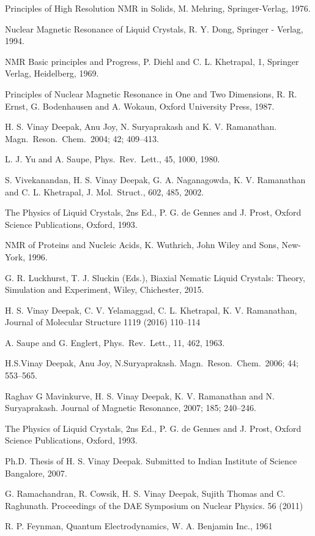\begin{thebibliography}{99}
 Principles of High Resolution NMR in Solids, M. Mehring, Springer-Verlag, 1976.

 Nuclear Magnetic Resonance of Liquid Crystals, R. Y. Dong, Springer - Verlag, 1994.

 NMR Basic principles and Progress, P. Diehl and C. L. Khetrapal, 1, Springer Verlag, Heidelberg, 1969.

 Principles of Nuclear Magnetic Resonance in One and Two Dimensions, R. R. Ernst, G. Bodenhausen and A. Wokaun, Oxford University Press, 1987.

 H. S. Vinay Deepak, Anu Joy, N. Suryaprakash and K. V. Ramanathan. Magn.\ Reson.\ Chem.\ 2004; 42; 409--413.

 L. J. Yu and A. Saupe, Phys.\ Rev.\ Lett., 45, 1000, 1980.

 S. Vivekanandan, H. S. Vinay Deepak, G. A. Naganagowda, K. V. Ramanathan and C. L. Khetrapal, J. Mol.\ Struct., 602, 485, 2002.

 The Physics of Liquid Crystals, 2ns Ed., P. G. de Gennes and J. Prost, Oxford Science Publications, Oxford, 1993.

 NMR of Proteins and Nucleic Acids, K. Wuthrich, John Wiley and Sons, New-York, 1996.

 G. R. Luckhurst, T. J. Sluckin (Eds.), Biaxial Nematic Liquid Crystals: Theory, Simulation and Experiment, Wiley, Chichester, 2015.

 H. S. Vinay Deepak, C. V. Yelamaggad, C. L. Khetrapal, K. V. Ramanathan, Journal of Molecular Structure 1119 (2016) 110--114

 A. Saupe and G. Englert, Phys.\ Rev.\ Lett., 11, 462, 1963.

 H.S.Vinay Deepak, Anu Joy, N.Suryaprakash. Magn.\ Reson.\ Chem.\ 2006; 44; 553--565.

 Raghav G Mavinkurve, H. S. Vinay Deepak, K. V. Ramanathan and N. Suryaprakash. Journal of Magnetic Resonance, 2007; 185; 240--246.

 The Physics of Liquid Crystals, 2ns Ed., P. G. de Gennes and J. Prost, Oxford Science Publications, Oxford, 1993.

 Ph.D. Thesis of H. S. Vinay Deepak. Submitted to Indian Institute of Science Bangalore, 2007.

 G. Ramachandran, R. Cowsik, H. S. Vinay Deepak, Sujith Thomas and C. Raghunath. Proceedings of the DAE Symposium on Nuclear Physics. 56 (2011)

 R. P. Feynman, Quantum Electrodynamics, W. A. Benjamin Inc., 1961
\end{thebibliography}
\vskip 0.5cm

